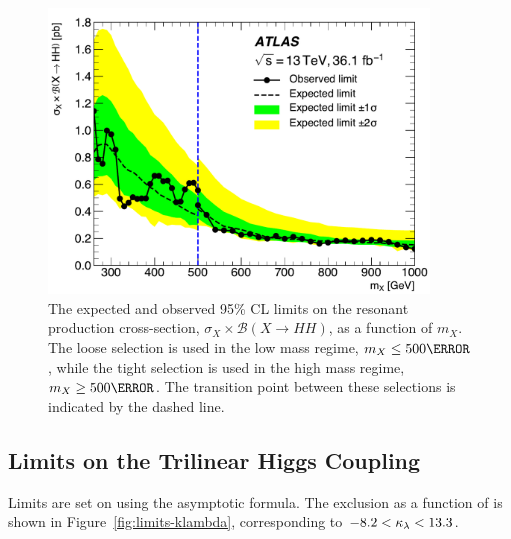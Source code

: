 \begin{figure}[!htbp]
  \centering
\includegraphics[width=0.9\textwidth]{chapters/chapter5_yybb/images/limits/resonant.pdf}
\caption[The expected and observed limits on the resonant \HH production cross-section as a function of $m_{X}$.]
{The expected and observed 95\% \gls{CL} limits on the resonant \HH production cross-section, $\sigma_{X} \times \mathcal{B}(X\rightarrow HH)$, as a function of $m_{X}$. The loose selection is used in the low mass regime, $m_{X} \leq \unit{500}{\GeV}$, while the tight selection is used in the high mass regime, $m_{X} \geq \unit{500}{\GeV}$. The transition point between these selections is indicated by the dashed line.} 
\label{fig:limits-resonant}
\end{figure}

\subsection{Limits on the Trilinear Higgs Coupling}

Limits are set on \klambda using the asymptotic formula. The exclusion as a function of \klambda is shown in Figure~\ref{fig:limits-klambda}, corresponding to $-8.2 < \kappa_{\lambda} < 13.3$.

